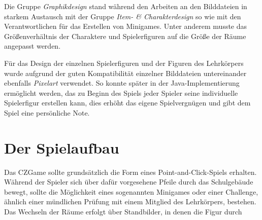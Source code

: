 Die Gruppe \emph{Graphikdesign} stand während den Arbeiten an den Bilddateien in starkem Austausch mit der Gruppe \emph{Item- \& Charakterdesign} so wie mit den Verantwortlichen für das Erstellen von Minigames. Unter anderem musste das Größenverhältnis der Charaktere und Spielerfiguren auf die Größe der Räume angepasst werden. 

Für das Design der einzelnen Spielerfiguren und der Figuren des Lehrkörpers wurde aufgrund der guten Kompatibilität einzelner Bilddateien untereinander ebenfalls \emph{Pixelart} verwendet. So konnte später in der Java-Implementierung ermöglicht werden, das zu Beginn des Spiels jeder Spieler seine individuelle Spielerfigur erstellen kann, dies erhöht das eigene Spielvergnügen und gibt dem Spiel eine persönliche Note.





\section{Der Spielaufbau}

Das CZGame sollte grundsätzlich die Form eines Point-and-Click-Spiels erhalten. Während der Spieler sich über dafür vorgesehene Pfeile durch das Schulgebäude bewegt, sollte die Möglichkeit eines sogenannten Minigames oder einer Challenge, ähnlich einer mündlichen Prüfung mit einem Mitglied des Lehrkörpers, bestehen. Das Wechseln der Räume erfolgt über Standbilder, in denen die Figur durch 

